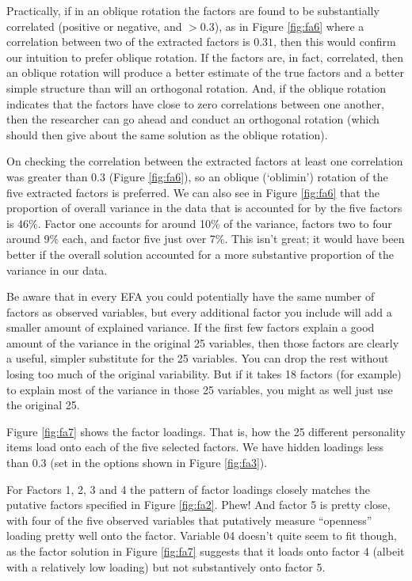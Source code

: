 Practically, if in an oblique rotation the factors are found to be substantially correlated (positive or negative, and $>0.3$), as in Figure \ref{fig:fa6} where a correlation between two of the extracted factors is $0.31$, then this would confirm our intuition to prefer oblique rotation. If the factors are, in fact, correlated, then an oblique rotation will produce a better estimate of the true factors and a better simple structure than will an orthogonal rotation. And, if the oblique rotation indicates that the factors have close to zero correlations between one another, then the researcher can go ahead and conduct an orthogonal rotation (which should then give about the same solution as the oblique rotation).

On checking the correlation between the extracted factors at least one correlation was greater than 0.3 (Figure \ref{fig:fa6}), so an oblique (`oblimin') rotation of the five extracted factors is preferred. We can also see in Figure \ref{fig:fa6} that the proportion of overall variance in the data that is accounted for by the five factors is 46\%. Factor one accounts for around 10\% of the variance, factors two to four around 9\% each, and factor five just over 7\%. This isn’t great; it would have been better if the overall solution accounted for a more substantive proportion of the variance in our data.

Be aware that in every EFA you could potentially have the same number of factors as observed variables, but every additional factor you include will add a smaller amount of explained variance. If the first few factors explain a good amount of the variance in the original 25 variables, then those factors are clearly a useful, simpler substitute for the 25 variables. You can drop the rest without losing too much of the original variability. But if it takes 18 factors (for example) to explain most of the variance in those 25 variables, you might as well just use the original 25.

Figure \ref{fig:fa7} shows the factor loadings. That is, how the 25 different personality items load onto each of the five selected factors. We have hidden loadings less than 0.3 (set in the options shown in Figure \ref{fig:fa3}).
 
For Factors 1, 2, 3 and 4 the pattern of factor loadings closely matches the putative factors specified in Figure \ref{fig:fa2}. Phew! And factor 5 is pretty close, with four of the five observed variables that putatively measure “openness” loading pretty well onto the factor. Variable 04 doesn’t quite seem to fit though, as the factor solution in Figure \ref{fig:fa7} suggests that it loads onto factor 4 (albeit with a relatively low loading) but not substantively onto factor 5.

